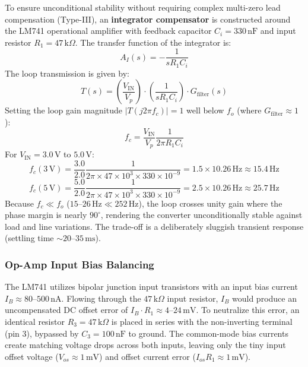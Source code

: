 \documentclass[12pt,a4paper]{article}
\newcommand{\Vin}{V_{\mathrm{IN}}}
\begin{document}
To ensure unconditional stability without requiring complex multi-zero lead compensation (Type-III), an \textbf{integrator compensator} is constructed around the LM741 operational amplifier with feedback capacitor $C_i = 330\,\mathrm{nF}$ and input resistor $R_1 = 47\,\mathrm{k}\Omega$. The transfer function of the integrator is:
\begin{equation}
    A_I(s) = -\frac{1}{s R_1 C_i}
\end{equation}
The loop transmission is given by:
\begin{equation}
    T(s) = \left(\frac{\Vin}{V_p}\right) \cdot \left(\frac{1}{s R_1 C_i}\right) \cdot G_{\mathrm{filter}}(s)
\end{equation}
Setting the loop gain magnitude $|T(j 2\pi f_c)| = 1$ well below $f_o$ (where $G_{\mathrm{filter}} \approx 1$):
\begin{equation}
    f_c = \frac{\Vin}{V_p} \frac{1}{2\pi R_1 C_i}
    \label{eq:fc}
\end{equation}
For $\Vin = 3.0\,\mathrm{V}$ to $5.0\,\mathrm{V}$:
\begin{equation}
    f_c(3\,\mathrm{V}) = \frac{3.0}{2.0} \frac{1}{2\pi \times 47\times 10^3 \times 330\times 10^{-9}} = 1.5 \times 10.26\,\mathrm{Hz} \approx 15.4\,\mathrm{Hz}
\end{equation}
\begin{equation}
    f_c(5\,\mathrm{V}) = \frac{5.0}{2.0} \frac{1}{2\pi \times 47\times 10^3 \times 330\times 10^{-9}} = 2.5 \times 10.26\,\mathrm{Hz} \approx 25.7\,\mathrm{Hz}
\end{equation}
Because $f_c \ll f_o$ ($15\text{--}26\,\mathrm{Hz} \ll 252\,\mathrm{Hz}$), the loop crosses unity gain where the phase margin is nearly $90^\circ$, rendering the converter unconditionally stable against load and line variations. The trade-off is a deliberately sluggish transient response (settling time $\sim 20\text{--}35\,\mathrm{ms}$).

\subsubsection{Op-Amp Input Bias Balancing}
The LM741 utilizes bipolar junction input transistors with an input bias current $I_B \approx 80\text{--}500\,\mathrm{nA}$. Flowing through the $47\,\mathrm{k}\Omega$ input resistor, $I_B$ would produce an uncompensated DC offset error of $I_B \cdot R_1 \approx 4\text{--}24\,\mathrm{mV}$. To neutralize this error, an identical resistor $R_3 = 47\,\mathrm{k}\Omega$ is placed in series with the non-inverting terminal (pin 3), bypassed by $C_3 = 100\,\mathrm{nF}$ to ground. The common-mode bias currents create matching voltage drops across both inputs, leaving only the tiny input offset voltage ($V_{os} \approx 1\,\mathrm{mV}$) and offset current error ($I_{os} R_1 \approx 1\,\mathrm{mV}$).
\end{document}
